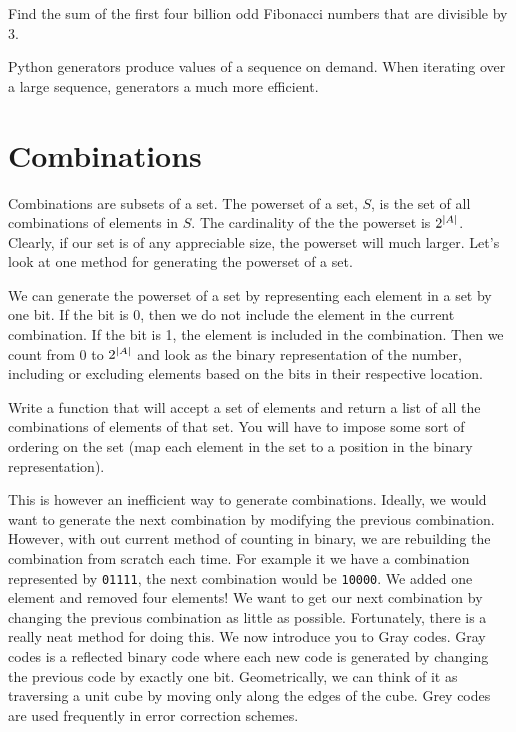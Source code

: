 \label{lab:Python_Generators}


\begin{problem}
Find the sum of the first four billion odd Fibonacci numbers that are divisible by 3.
\end{problem}


Python generators produce values of a sequence on demand.  When iterating over a large
sequence, generators a much more efficient.

\section*{Combinations}
Combinations are subsets of a set.  The powerset of a set, $S$, is the set of all combinations
of elements in $S$.  The cardinality of the the powerset is $2^{\left\lvert A\right\rvert}$.  Clearly, if our
set is of any appreciable size, the powerset will much larger.  Let's look at one method for
generating the powerset of a set.

We can generate the powerset of a set by representing each element in a set by one bit.
If the bit is 0, then we do not include the element in the current combination.  If the
bit is 1, the element is included in the combination.  Then we count from 0 to $2^{\left\lvert A\right\rvert}$
and look as the binary representation of the number, including or excluding elements based
on the bits in their respective location.

\begin{problem}
Write a function that will accept a set of elements and return a list of all the combinations
of elements of that set.  You will have to impose some sort of ordering on the set (map each element
in the set to a position in the binary representation).
\end{problem}

This is however an inefficient way to generate combinations.  Ideally, we would want
to generate the next combination by modifying the previous combination.  However, with
out current method of counting in binary, we are rebuilding the combination from scratch
each time.  For example it we have a combination represented by \texttt{01111}, the next
combination would be \texttt{10000}.  We added one element and removed four elements!
We want to get our next combination by changing the previous combination as little as possible.
Fortunately, there is a really neat method for doing this.  We now introduce you to
Gray codes.  Gray codes is a reflected binary code where each new code is generated by
changing the previous code by exactly one bit.  Geometrically, we can think of it as
traversing a unit cube by moving only along the edges of the cube.  Grey codes are used frequently
in error correction schemes.

